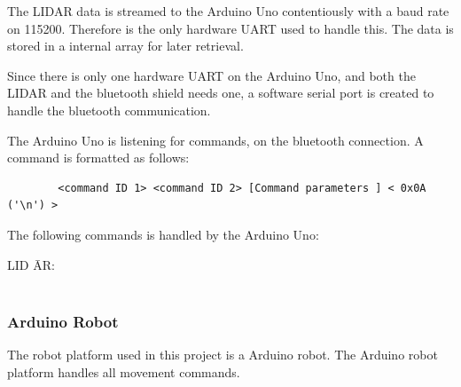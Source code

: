 The LIDAR data is streamed to the Arduino Uno contentiously with a baud rate on 115200. Therefore is the only hardware UART used to handle this. The data is stored in a internal array for later retrieval.

Since there is only one hardware UART on the Arduino Uno, and both the LIDAR and the bluetooth shield needs one, a software serial port is created to handle the bluetooth communication. 

The Arduino Uno is listening for commands, on the bluetooth connection. A command is formatted as follows: 
\begin{verbatim}
		<command ID 1> <command ID 2> [Command parameters ] < 0x0A ('\n') >
\end{verbatim}

The following commands is handled by the Arduino Uno: 

\begin{tabbing}	
LID \= AR:\\
 \\

\end{tabbing}	

  

\subsubsection{Arduino Robot}
The robot platform used in this project is a Arduino robot\cite{ArduinoRobot}. The Arduino robot platform handles all movement commands.


 
